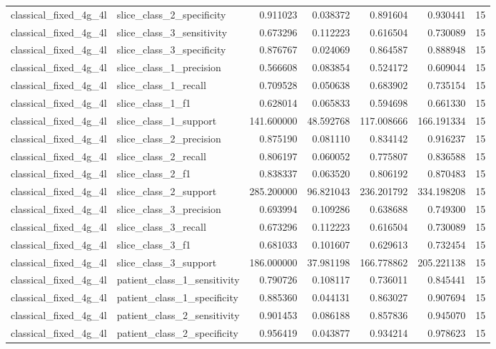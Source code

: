 \begin{tabular}{llrrrrr}
classical_fixed_4g_4l & slice_class_2_specificity & 0.911023 & 0.038372 & 0.891604 & 0.930441 & 15 \\
classical_fixed_4g_4l & slice_class_3_sensitivity & 0.673296 & 0.112223 & 0.616504 & 0.730089 & 15 \\
classical_fixed_4g_4l & slice_class_3_specificity & 0.876767 & 0.024069 & 0.864587 & 0.888948 & 15 \\
classical_fixed_4g_4l & slice_class_1_precision & 0.566608 & 0.083854 & 0.524172 & 0.609044 & 15 \\
classical_fixed_4g_4l & slice_class_1_recall & 0.709528 & 0.050638 & 0.683902 & 0.735154 & 15 \\
classical_fixed_4g_4l & slice_class_1_f1 & 0.628014 & 0.065833 & 0.594698 & 0.661330 & 15 \\
classical_fixed_4g_4l & slice_class_1_support & 141.600000 & 48.592768 & 117.008666 & 166.191334 & 15 \\
classical_fixed_4g_4l & slice_class_2_precision & 0.875190 & 0.081110 & 0.834142 & 0.916237 & 15 \\
classical_fixed_4g_4l & slice_class_2_recall & 0.806197 & 0.060052 & 0.775807 & 0.836588 & 15 \\
classical_fixed_4g_4l & slice_class_2_f1 & 0.838337 & 0.063520 & 0.806192 & 0.870483 & 15 \\
classical_fixed_4g_4l & slice_class_2_support & 285.200000 & 96.821043 & 236.201792 & 334.198208 & 15 \\
classical_fixed_4g_4l & slice_class_3_precision & 0.693994 & 0.109286 & 0.638688 & 0.749300 & 15 \\
classical_fixed_4g_4l & slice_class_3_recall & 0.673296 & 0.112223 & 0.616504 & 0.730089 & 15 \\
classical_fixed_4g_4l & slice_class_3_f1 & 0.681033 & 0.101607 & 0.629613 & 0.732454 & 15 \\
classical_fixed_4g_4l & slice_class_3_support & 186.000000 & 37.981198 & 166.778862 & 205.221138 & 15 \\
classical_fixed_4g_4l & patient_class_1_sensitivity & 0.790726 & 0.108117 & 0.736011 & 0.845441 & 15 \\
classical_fixed_4g_4l & patient_class_1_specificity & 0.885360 & 0.044131 & 0.863027 & 0.907694 & 15 \\
classical_fixed_4g_4l & patient_class_2_sensitivity & 0.901453 & 0.086188 & 0.857836 & 0.945070 & 15 \\
classical_fixed_4g_4l & patient_class_2_specificity & 0.956419 & 0.043877 & 0.934214 & 0.978623 & 15 \\

\end{tabular}

